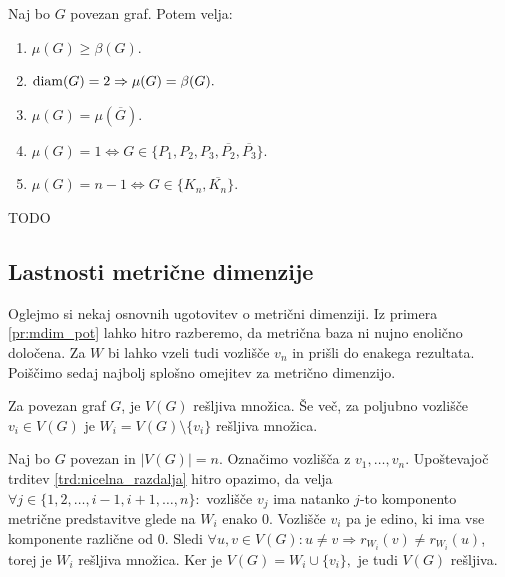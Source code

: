 \documentclass[mat1, tisk]{fmfdelo}
\newcommand{\1}{(1, 1, \ldots, 1)}
\newcommand{\2}{(2, 2, \ldots, 2)}
\begin{document}
\begin{trditev} \label{trd:lastnosti_sdim}
    Naj bo $G$ povezan graf. Potem velja:
    \begin{enumerate}
        \item $\mu(G) \geq \beta(G)$.
        \item ${\rm diam}(G) = 2 \Rightarrow \mu(G) = \beta(G).$
        \item $\mu(G) = \mu(\overline{G}).$
        \item $\mu(G) = 1 \Leftrightarrow G \in \{P_1, P_2, P_3, \overline{P_2}, \overline{P_3}\}.$
        \item $\mu(G) = n - 1 \Leftrightarrow G \in \{K_n, \overline{K_n}\}.$
    \end{enumerate}
\end{trditev}

\begin{dokaz}
    TODO
\end{dokaz}



\subsection{Lastnosti metrične dimenzije} \label{s:lastnosti_mdim}

Oglejmo si nekaj osnovnih ugotovitev o metrični dimenziji. Iz primera \ref{pr:mdim_pot}
lahko hitro razberemo, da metrična baza ni nujno enolično določena. Za $W$ bi lahko 
vzeli tudi vozlišče $v_n$ in prišli do enakega rezultata. 
Poiščimo sedaj najbolj splošno omejitev za metrično dimenzijo.

\begin{trditev} \label{trd:cela_resljiva}
Za povezan graf $G$, je $V(G)$ rešljiva množica. Še več, za poljubno vozlišče $v_i \in V(G)$
je $W_i = V(G) \setminus \{ v_i\}$ rešljiva množica.
\end{trditev}

\begin{dokaz}
Naj bo $G$ povezan in $|V(G)|= n$. Označimo vozlišča z $v_1, \ldots, v_n$.
Upoštevajoč trditev \ref{trd:nicelna_razdalja} hitro opazimo, da velja 
$\forall j \in \{ 1, 2, \ldots , i - 1, i + 1, \ldots , n\}:$ vozlišče $v_j$ ima natanko $j$-to komponento 
metrične predstavitve glede na $W_i$ enako $0$. Vozlišče $v_i$ pa je edino, ki ima vse komponente 
različne od $0.$ Sledi $\forall u, v \in V(G): u \neq v \Rightarrow r_{W_i}(v) \neq r_{W_i}(u)$, 
torej je $W_i$ rešljiva množica.
Ker je $V(G) = W_i \cup \{ v_i\},$ je tudi $V(G)$ rešljiva.
\end{dokaz}
\end{document}
